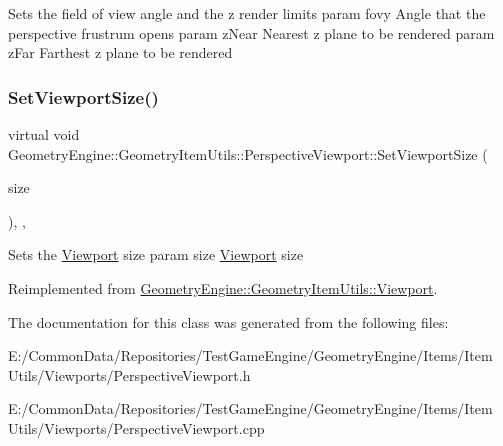Sets the field of view angle and the z render limits param fovy Angle that the perspective frustrum opens param z\+Near Nearest z plane to be rendered param z\+Far Farthest z plane to be rendered \mbox{\label{class_geometry_engine_1_1_geometry_item_utils_1_1_perspective_viewport_a01764cc11407ed9ce70111a627c823ae}} 
\subsubsection{\texorpdfstring{SetViewportSize()}{SetViewportSize()}}
{\footnotesize\ttfamily virtual void Geometry\+Engine\+::\+Geometry\+Item\+Utils\+::\+Perspective\+Viewport\+::\+Set\+Viewport\+Size (\begin{DoxyParamCaption}\item[{const Q\+Vector4D \&}]{size }\end{DoxyParamCaption})\hspace{0.3cm}{\ttfamily [inline]}, {\ttfamily [override]}, {\ttfamily [virtual]}}

Sets the \mbox{\hyperlink{class_geometry_engine_1_1_geometry_item_utils_1_1_viewport}{Viewport}} size param size \mbox{\hyperlink{class_geometry_engine_1_1_geometry_item_utils_1_1_viewport}{Viewport}} size 

Reimplemented from \mbox{\hyperlink{class_geometry_engine_1_1_geometry_item_utils_1_1_viewport_aee56ad377f9615e64c33bdef3d05c94f}{Geometry\+Engine\+::\+Geometry\+Item\+Utils\+::\+Viewport}}.



The documentation for this class was generated from the following files\+:\begin{DoxyCompactItemize}
\item 
E\+:/\+Common\+Data/\+Repositories/\+Test\+Game\+Engine/\+Geometry\+Engine/\+Items/\+Item Utils/\+Viewports/Perspective\+Viewport.\+h\item 
E\+:/\+Common\+Data/\+Repositories/\+Test\+Game\+Engine/\+Geometry\+Engine/\+Items/\+Item Utils/\+Viewports/Perspective\+Viewport.\+cpp\end{DoxyCompactItemize}
